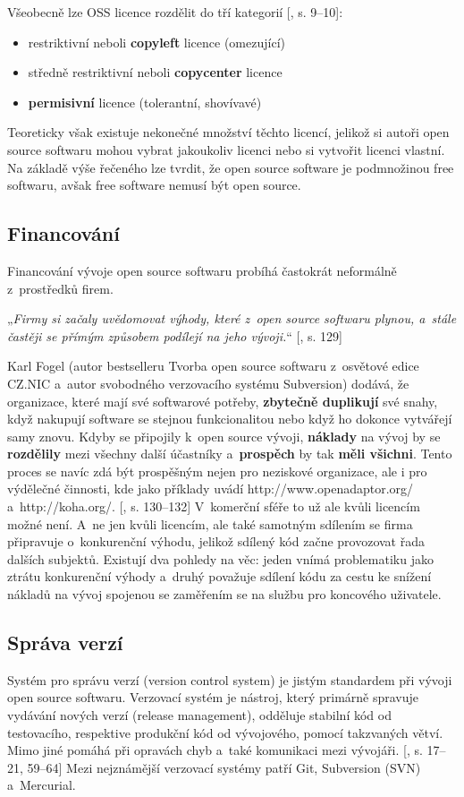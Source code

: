 \documentclass[
	11pt, oneside, printed, final, palatino
	microtype,
	table,   %
	lof,     %
	lot     %
]{fithesis3}
\makeatletter
\newcommand{\citepages}[2]{[\cite{#2}, s. #1]}
\newcommand{\bold}[1]{\textbf{#1}}
\newcommand{\citace}[1]{„\textit{#1}“} %
\newcommand{\mezera}{\bigskip}
\makeatother
\begin{document}
{Všeobecně lze OSS licence rozdělit do tří kategorií \citepages{9–10}{6226510}:
\begin{itemize}
\item restriktivní neboli \bold{copyleft} licence (omezující)
\item středně restriktivní neboli \bold{copycenter} licence
\item \bold{permisivní} licence (tolerantní, shovívavé)
\end{itemize}
\indent Teoreticky však existuje nekonečné množství těchto licencí, jelikož si autoři open source softwaru mohou vybrat jakoukoliv licenci nebo si vytvořit licenci vlastní.
Na základě výše řečeného lze tvrdit, že open source software je podmnožinou free softwaru, avšak free software nemusí být open source.

\subsection{Financování}
Financování vývoje open source softwaru probíhá častokrát neformálně z~prostředků firem.

\mezera 
\citace{Firmy si začaly uvědomovat výhody, které z~open source softwaru plynou, a~stále častěji se přímým způsobem podílejí na jeho vývoji.} \citepages{129}{Fogel2012}
\mezera

Karl Fogel (autor bestselleru Tvorba open source softwaru z~osvětové edice CZ.NIC a~autor svobodného verzovacího systému Subversion) dodává, že organizace, které mají své softwarové potřeby, \bold{zbytečně duplikují} své snahy, když nakupují software se stejnou funkcionalitou nebo když ho dokonce vytvářejí samy znovu. Kdyby se připojily k~open source vývoji, \bold{náklady} na vývoj by se \bold{rozdělily} mezi všechny další účastníky a~\bold{prospěch} by tak \bold{měli všichni}. Tento proces se navíc zdá být prospěšným nejen pro neziskové organizace, ale i pro výdělečné činnosti, kde jako příklady uvádí http://www.openadaptor.org/ a~http://koha.org/. \citepages{130–132}{Fogel2012} V~komerční sféře to už ale kvůli licencím možné není. A~ne jen kvůli licencím, ale také samotným sdílením se firma připravuje o~konkurenční výhodu, jelikož sdílený kód začne provozovat řada dalších subjektů. Existují dva pohledy na věc: jeden vnímá problematiku jako ztrátu konkurenční výhody a~druhý považuje sdílení kódu za cestu ke snížení nákladů na vývoj spojenou se zaměřením se na službu pro koncového uživatele.


\subsection{Správa verzí}
Systém pro správu verzí (version control system) je jistým standardem při vývoji open source softwaru. Verzovací systém je nástroj, který primárně spravuje vydávání nových verzí (release management), odděluje stabilní kód od testovacího, respektive produkční kód od vývojového, pomocí takzvaných větví. Mimo jiné pomáhá při opravách chyb a~také komunikaci mezi vývojáři. \citepages{17–21, 59–64}{Chaconc2009} Mezi nejznámější verzovací systémy patří Git, Subversion (SVN) a~Mercurial.

}
\end{document}
